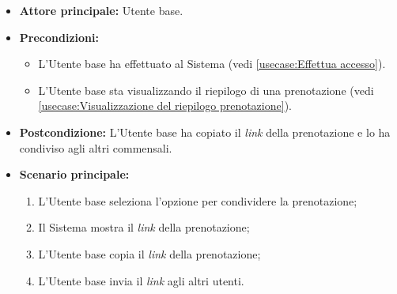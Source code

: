 \label{usecase:Condivisione della prenotazione}
\begin{itemize}
	\item \textbf{Attore principale:} Utente base.

	\item \textbf{Precondizioni:}
	\begin{itemize}
		\item L'Utente base ha effettuato al Sistema (vedi \autoref{usecase:Effettua accesso}).
		\item L'Utente base sta visualizzando il riepilogo di una prenotazione (vedi \autoref{usecase:Visualizzazione del riepilogo prenotazione}).
	\end{itemize}

	\item \textbf{Postcondizione:}
	      L'Utente base ha copiato il \textit{link} della prenotazione e lo ha condiviso agli altri commensali.

	\item \textbf{Scenario principale:}
	      \begin{enumerate}
		      \item L'Utente base seleziona l'opzione per condividere la prenotazione;
		      \item Il Sistema mostra il \textit{link} della prenotazione;
		      \item L'Utente base copia il \textit{link} della prenotazione;
		      \item L'Utente base invia il \textit{link} agli altri utenti.
	      \end{enumerate}
\end{itemize}